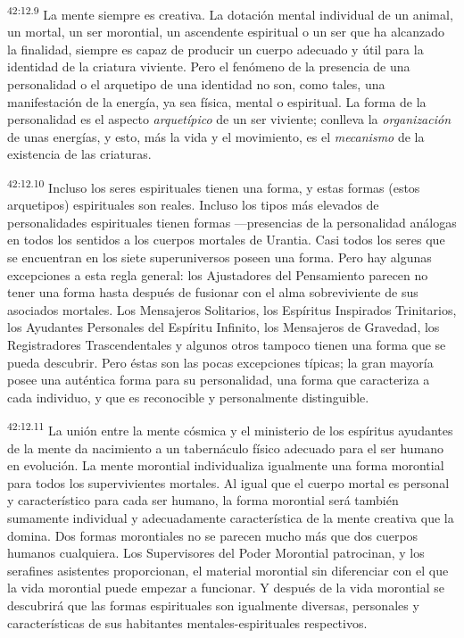 \par
\textsuperscript{42:12.9} La mente siempre es creativa. La dotación mental individual de un animal, un mortal, un ser morontial, un ascendente espiritual o un ser que ha alcanzado la finalidad, siempre es capaz de producir un cuerpo adecuado y útil para la identidad de la criatura viviente. Pero el fenómeno de la presencia de una personalidad o el arquetipo de una identidad no son, como tales, una manifestación de la energía, ya sea física, mental o espiritual. La forma de la personalidad es el aspecto \textit{arquetípico} de un ser viviente; conlleva la \textit{organización} de unas energías, y esto, más la vida y el movimiento, es el \textit{mecanismo} de la existencia de las criaturas.

\par
\textsuperscript{42:12.10} Incluso los seres espirituales tienen una forma, y estas formas (estos arquetipos) espirituales son reales. Incluso los tipos más elevados de personalidades espirituales tienen formas ---presencias de la personalidad análogas en todos los sentidos a los cuerpos mortales de Urantia. Casi todos los seres que se encuentran en los siete superuniversos poseen una forma. Pero hay algunas excepciones a esta regla general: los Ajustadores del Pensamiento parecen no tener una forma hasta después de fusionar con el alma sobreviviente de sus asociados mortales. Los Mensajeros Solitarios, los Espíritus Inspirados Trinitarios, los Ayudantes Personales del Espíritu Infinito, los Mensajeros de Gravedad, los Registradores Trascendentales y algunos otros tampoco tienen una forma que se pueda descubrir. Pero éstas son las pocas excepciones típicas; la gran mayoría posee una auténtica forma para su personalidad, una forma que caracteriza a cada individuo, y que es reconocible y personalmente distinguible.

\par
\textsuperscript{42:12.11} La unión entre la mente cósmica y el ministerio de los espíritus ayudantes de la mente da nacimiento a un tabernáculo físico adecuado para el ser humano en evolución. La mente morontial individualiza igualmente una forma morontial para todos los supervivientes mortales. Al igual que el cuerpo mortal es personal y característico para cada ser humano, la forma morontial será también sumamente individual y adecuadamente característica de la mente creativa que la domina. Dos formas morontiales no se parecen mucho más que dos cuerpos humanos cualquiera. Los Supervisores del Poder Morontial patrocinan, y los serafines asistentes proporcionan, el material morontial sin diferenciar con el que la vida morontial puede empezar a funcionar. Y después de la vida morontial se descubrirá que las formas espirituales son igualmente diversas, personales y características de sus habitantes mentales-espirituales respectivos.

